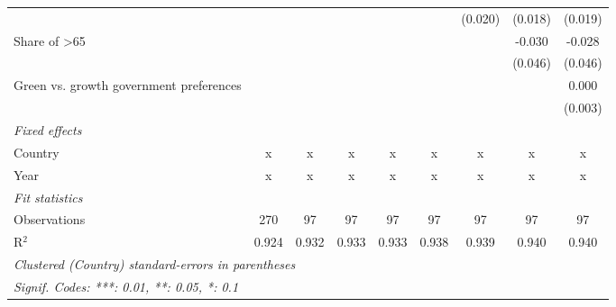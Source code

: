 \begin{table}[htbp]
\begin{tabular}{lcccccccc}
                                                            &         &         &         &         &         & (0.020) & (0.018) & (0.019)\\   
      Share of >65                                          &         &         &         &         &         &         & -0.030  & -0.028\\   
                                                            &         &         &         &         &         &         & (0.046) & (0.046)\\   
      Green vs. growth government preferences               &         &         &         &         &         &         &         & 0.000\\   
                                                            &         &         &         &         &         &         &         & (0.003)\\   
      \emph{Fixed effects}\\
      Country                                               & x       & x       & x       & x       & x       & x       & x       & x\\  
      Year                                                  & x       & x       & x       & x       & x       & x       & x       & x\\  
      \midrule \emph{Fit statistics}\\
      Observations                                          & 270     & 97      & 97      & 97      & 97      & 97      & 97      & 97\\  
      R$^2$                                                 & 0.924   & 0.932   & 0.933   & 0.933   & 0.938   & 0.939   & 0.940   & 0.940\\  
      \midrule
      \multicolumn{9}{l}{\emph{Clustered (Country) standard-errors in parentheses}}\\
      \multicolumn{9}{l}{\emph{Signif. Codes: ***: 0.01, **: 0.05, *: 0.1}}\\
   \end{tabular}
\end{table}


